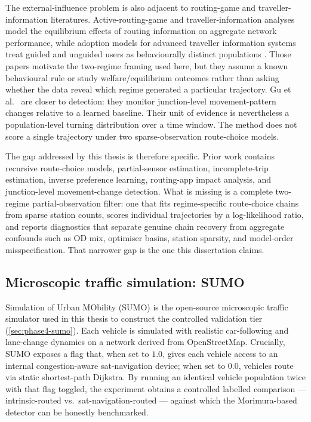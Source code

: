The external-influence problem is also adjacent to routing-game and
traveller-information literatures. Active-routing-game and
traveller-information analyses
\cite{acemoglu2018informational, krichene2018} model the equilibrium effects of
routing information on aggregate network performance, while adoption
models for advanced traveller information systems treat guided and
unguided users as behaviourally distinct populations \cite{yang2001atis}.
Those papers motivate the two-regime framing used here, but they assume
a known behavioural rule or study welfare/equilibrium outcomes rather
than asking whether the data reveal which regime generated a particular
trajectory. Gu et al.~\cite{gu2018} are closer to detection: they monitor
junction-level movement-pattern changes relative to a learned baseline.
Their unit of evidence is nevertheless a population-level turning
distribution over a time window. The method does not score a single
trajectory under two sparse-observation route-choice models.

The gap addressed by this thesis is therefore specific. Prior work
contains recursive route-choice models, partial-sensor estimation,
incomplete-trip estimation, inverse preference learning, routing-app
impact analysis, and junction-level movement-change detection. What is
missing is a complete two-regime partial-observation filter: one
that fits regime-specific route-choice chains from sparse station counts,
scores individual trajectories by a log-likelihood ratio, and reports
diagnostics that separate genuine chain recovery from aggregate
confounds such as OD mix, optimiser basins, station sparsity, and
model-order misspecification. That narrower gap is the one this
dissertation claims.

\subsection{Microscopic traffic simulation: SUMO}
\label{sec:sumo}

Simulation of Urban MObility (SUMO) \cite{lopez2018} is the open-source
microscopic traffic simulator used in this thesis to construct the
controlled validation tier (\cref{sec:phase4-sumo}). Each vehicle is
simulated with realistic car-following and lane-change dynamics on a
network derived from OpenStreetMap. Crucially, SUMO exposes a
 flag that, when set to $1.0$,
gives each vehicle access to an internal congestion-aware
sat-navigation device; when set to $0.0$, vehicles route via static
shortest-path Dijkstra. By running an identical vehicle population
twice with that flag toggled, the experiment obtains a controlled labelled
comparison --- intrinsic-routed vs.\ sat-navigation-routed --- against
which the Morimura-based detector can be honestly benchmarked.

